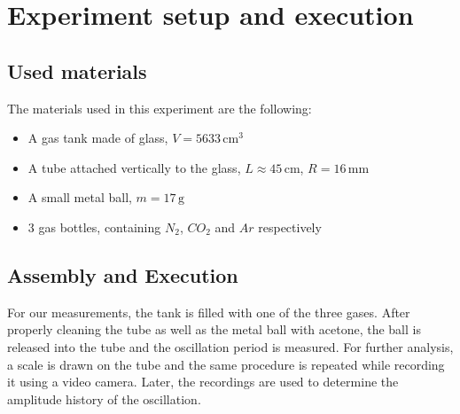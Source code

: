 \documentclass{scrreprt}
\newcommand{\unit}[1]{\ensuremath{\, \mathrm{#1}}}
\begin{document}
\section{Experiment setup and execution}

\subsection{Used materials}
The materials used in this experiment are the following:
\begin{itemize}
\item A gas tank made of glass, $V = 5633 \unit{cm^3}$
\item A tube attached vertically to the glass, $L \approx 45\unit{cm}$, $R = 16 \unit{mm}$
\item A small metal ball, $m = 17 \unit{g}$
\item 3 gas bottles, containing $N_2$, $CO_2$ and $Ar$ respectively
\end{itemize}

\subsection{Assembly and Execution}
For our measurements, the tank is filled with one of the three gases. After properly cleaning the tube as well as the metal ball with acetone, the ball is released into the tube and the oscillation period is measured. For further analysis, a scale is drawn on the tube and the same procedure is repeated while recording it using a video camera. Later, the recordings are used to determine the amplitude history of the oscillation.
\end{document}
